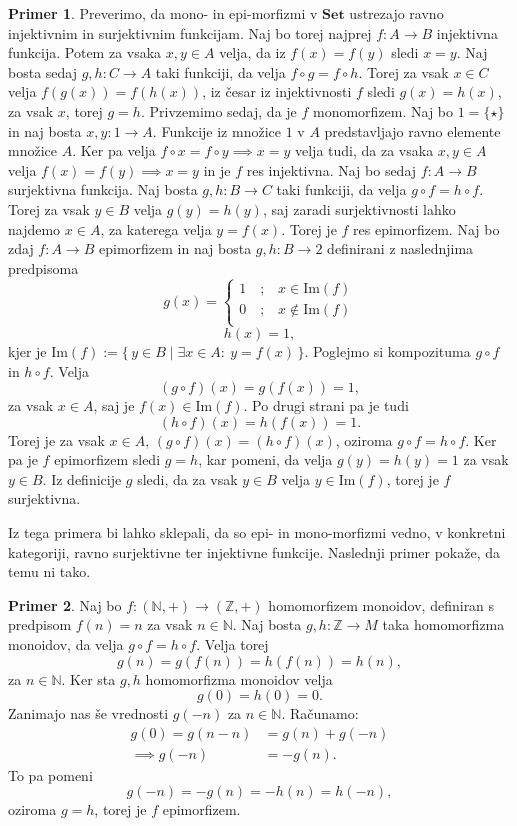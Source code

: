 \documentclass[12pt,a4paper]{book}
\theoremstyle{definition}
\theoremstyle{plain}
\theoremstyle{definition}
\newtheorem{primer}{Primer}[section]
\theoremstyle{remark}
\newcommand{\cat}[1]{\textbf{#1}}
\renewcommand{\set}[1]{\{\,#1\,\}}
\begin{document}
\begin{primer} \label{primer:mono v Set}
Preverimo, da mono- in epi-morfizmi v $\cat{Set}$ ustrezajo ravno injektivnim in surjektivnim funkcijam. Naj bo torej najprej $f : A \to B$ injektivna funkcija. Potem za vsaka $x,y \in A$ velja, da iz $f(x) = f(y)$ sledi $x = y$. Naj bosta sedaj $g,h : C \to A$ taki funkciji, da velja $f \circ g = f \circ h$. Torej za vsak $x \in C$ velja $f(g(x)) = f(h(x))$, iz česar iz injektivnosti $f$ sledi $g(x) = h(x)$, za vsak $x$, torej $g = h$. 
Privzemimo sedaj, da je $f$ monomorfizem. Naj bo $1 = \{\star\}$ in naj bosta $x,y : 1 \to A$. Funkcije iz množice $1$ v $A$ predstavljajo ravno elemente množice $A$. Ker pa velja $f \circ x = f \circ y \implies x = y$ velja tudi, da za vsaka $x,y \in A$ velja $f(x) = f(y) \implies x = y$ in je $f$ res injektivna. Naj bo sedaj $f : A \rightarrow B$ surjektivna funkcija. Naj bosta $g,h : B \to C$ taki funkciji, da velja $g \circ f = h \circ f$. Torej za vsak $y \in B$ velja $g(y) = h(y)$, saj zaradi surjektivnosti lahko najdemo $x \in A$, za katerega velja $y = f(x)$. Torej je $f$ res epimorfizem. Naj bo zdaj $f : A \to B$ epimorfizem in naj bosta $g,h : B \to 2$ definirani z naslednjima predpisoma
\[
g(x)=
\begin{cases}
1 \quad\text{;}\quad x \in \mathrm{Im}(f) \\
0 \quad\text{;}\quad x \notin \mathrm{Im}(f) \\
\end{cases}
\]
$$ h(x) = 1,$$
kjer je $\mathrm{Im}(f) := \set{y \in B \mid \exists x \in A : \ y = f(x)}$.
Poglejmo si kompozituma $g \circ f$ in $h \circ f$. Velja 
$$(g \circ f)(x) = g(f(x)) = 1,$$
za vsak $x \in A$, saj je $f(x) \in \mathrm{Im}(f)$. Po drugi strani pa je tudi 
$$(h \circ f)(x) = h(f(x)) = 1.$$
Torej je za vsak $x \in A$, $(g \circ f)(x) = (h \circ f)(x)$, oziroma $g\circ f = h\circ f$. Ker pa je $f$ epimorfizem sledi $g = h$, kar pomeni, da velja $g(y) = h(y) = 1$ za vsak $y \in B$. Iz definicije $g$ sledi, da za vsak $y \in B$ velja $y \in \mathrm{Im}(f)$, torej je $f$ surjektivna.
\end{primer}

Iz tega primera bi lahko sklepali, da so epi- in mono-morfizmi vedno, v konkretni kategoriji, ravno surjektivne ter injektivne funkcije. Naslednji primer pokaže, da temu ni tako.

\begin{primer}
Naj bo $f : (\mathbb{N},+) \to (\mathbb{Z},+)$ homomorfizem monoidov, definiran s predpisom $f(n) = n$ za vsak $n \in \mathbb{N}$. Naj bosta $g,h: \mathbb{Z} \to M$ taka homomorfizma monoidov, da velja $g \circ f = h \circ f$. 
Velja torej
$$g(n) = g(f(n)) = h(f(n)) = h(n),$$
za $n \in \mathbb{N}$.
Ker sta $g,h$ homomorfizma monoidov velja
$$g(0) = h(0) = 0.$$
Zanimajo nas še vrednosti $g(-n)$ za $n \in \mathbb{N}$. 
Računamo:
\begin{align*}
g(0) = g(n - n) &= g(n) + g(-n) \\
\implies g(-n) &= -g(n).
\end{align*}
To pa pomeni
$$g(-n) = -g(n) = -h(n) = h(-n),$$
%
oziroma $g = h$, torej je $f$ epimorfizem.
\end{primer}
\end{document}
